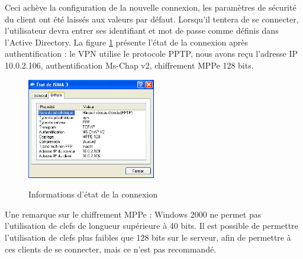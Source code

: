 Ceci achève la configuration de la nouvelle connexion, les paramètres de sécurité du client ont été laissés aux valeurs par défaut. Lorsqu'il tentera de se connecter, l'utilisateur devra entrer ses identifiant et mot de passe comme définis dans l'Active Directory. La figure \ref{VPN_ETAPE7} présente l'état de la connexion après authentification : le VPN utilise le protocole PPTP, nous avons reçu l'adresse IP 10.0.2.106, authentification Ms-Chap v2, chiffrement MPPe 128 bits.

\begin{figure}[H]
	\begin{center}
		\includegraphics[width=0.50\textwidth]{partie_2/screen_windows/etape7.PNG}\\
	\end{center}
	\caption{Informations d'état de la connexion}
	\label{VPN_ETAPE7}
\end{figure}



Une remarque sur le chiffrement MPPe : Windows 2000 ne permet pas l'utilisation de clefs de longueur supérieure à 40 bits. Il est possible de permettre l'utilisation de clefs plus faibles que 128 bits sur le serveur, afin de permettre à ces clients de se connecter, mais ce n'est pas recommandé.

